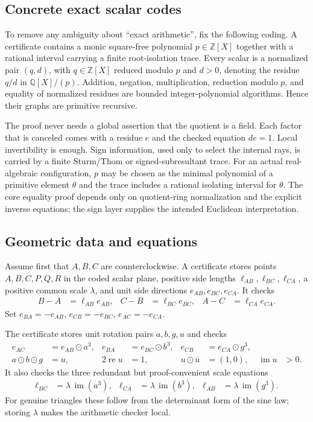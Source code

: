 \documentclass[11pt]{article}
\theoremstyle{definition}
\newcommand{\Q}{\mathbb Q}
\newcommand{\rotmul}{\mathbin{\odot}}
\newcommand{\im}{\operatorname{im}}
\newcommand{\re}{\operatorname{re}}
\begin{document}
\subsection{Concrete exact scalar codes}
To remove any ambiguity about ``exact arithmetic'', fix the following coding.
A certificate contains a monic square-free polynomial $p\in\mathbb Z[X]$ together with a rational interval carrying a finite root-isolation trace.  Every scalar
is a normalized pair $(q,d)$, with $q\in\mathbb Z[X]$ reduced modulo $p$ and
$d>0$, denoting the residue $q/d$ in $\Q[X]/(p)$.  Addition, negation,
multiplication, reduction modulo $p$, and equality of normalized residues are
bounded integer-polynomial algorithms.  Hence their graphs are primitive
recursive.

The proof never needs a global assertion that the quotient is a field.  Each
factor that is canceled comes with a residue $e$ and the checked equation
$d e=1$.  Local invertibility is enough.  Sign information, used only to select
the internal rays, is carried by a finite Sturm/Thom or signed-subresultant
trace.  For an actual real-algebraic configuration, $p$ may be chosen as the
minimal polynomial of a primitive element $\theta$ and the trace includes a
rational isolating interval for $\theta$.  The core equality proof depends
only on quotient-ring normalization and the explicit inverse equations; the
sign layer supplies the intended Euclidean interpretation.

\subsection{Geometric data and equations}
Assume first that $A,B,C$ are counterclockwise.  A certificate stores points
$A,B,C,P,Q,R$ in the coded scalar plane, positive side lengths
$\ell_{AB},\ell_{BC},\ell_{CA}$, a positive common scale $\lambda$,
and unit side directions $e_{AB},e_{BC},e_{CA}$.  It checks
\begin{align*}
 B-A&=\ell_{AB}e_{AB},&
 C-B&=\ell_{BC}e_{BC},&
 A-C&=\ell_{CA}e_{CA}.
\end{align*}
Set $e_{BA}=-e_{AB}$, $e_{CB}=-e_{BC}$, $e_{AC}=-e_{CA}$.

The certificate stores unit rotation pairs $a,b,g,u$ and checks
\begin{align}
 e_{AC}&=e_{AB}\rotmul a^3,
 &e_{BA}&=e_{BC}\rotmul b^3,
 &e_{CB}&=e_{CA}\rotmul g^3,
 \tag{4.1}\label{eq:third-rots}\\
 a\rotmul b\rotmul g&=u,
 &2\re u&=1,
 &u\rotmul\bar u&=(1,0),
 &\im u&>0.
 \tag{4.2}\label{eq:sixty-cert}
\end{align}
It also checks the three redundant but proof-convenient scale equations
\begin{align}
 \ell_{BC}&=\lambda\,\im(a^3),&
 \ell_{CA}&=\lambda\,\im(b^3),&
 \ell_{AB}&=\lambda\,\im(g^3).
 \tag{4.3}\label{eq:scale-cert}
\end{align}
For genuine triangles these follow from the determinant form of the sine law;
storing $\lambda$ makes the arithmetic checker local.
\end{document}
